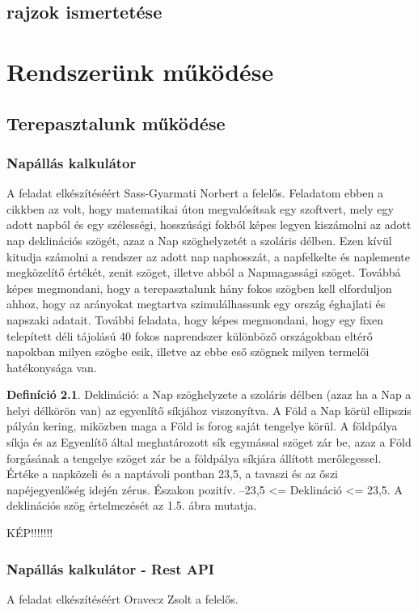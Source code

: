 \documentclass[
]{thesis-ekf}
\theoremstyle{definition}
\newtheorem{definicio}[tetel]{Definíció}
\theoremstyle{remark}
\begin{document}
	\section{rajzok ismertetése}

\chapter{Rendszerünk működése}
	\section{Terepasztalunk működése}
		\subsection{Napállás kalkulátor}
			A feladat elkészítéséért Sass-Gyarmati Norbert a felelős. Feladatom ebben a cikkben az volt, hogy matematikai úton megvalósítsak egy szoftvert, mely egy adott napból és egy szélességi, hosszúsági fokból képes legyen kiszámolni az adott nap deklinációs szögét, azaz a Nap szöghelyzetét a szoláris délben. Ezen kívül kitudja számolni a rendszer az adott nap naphosszát, a napfelkelte és naplemente megközelítő értékét, zenit szöget, illetve abból a Napmagassági szöget. Továbbá képes megmondani, hogy a terepasztalunk hány fokos szögben kell elforduljon ahhoz, hogy az arányokat megtartva szimulálhassunk egy ország éghajlati és napszaki adatait. További feladata, hogy képes megmondani, hogy egy fixen telepített déli tájolású 40 fokos naprendszer különböző országokban eltérő napokban milyen szögbe esik, illetve az ebbe eső szögnek milyen termelői hatékonysága van.
			\begin{definicio}
				Deklináció: a Nap szöghelyzete a szoláris délben (azaz ha a Nap a helyi délkörön van) az egyenlítő síkjához viszonyítva. A Föld a Nap körül ellipszis pályán kering, miközben maga a Föld is forog saját tengelye körül. A földpálya síkja és az Egyenlítő által meghatározott sík egymással szöget zár be, azaz a Föld forgásának a tengelye szöget zár be a földpálya síkjára állított merőlegessel. Értéke a napközeli és a naptávoli pontban 23,5, a tavaszi és az őszi napéjegyenlőség idején zérus. Északon pozitív. –23,5 <=  Deklináció <= 23,5. A deklinációs szög értelmezését az 1.5. ábra mutatja.
				\par KÉP!!!!!!!
				\cite{Kornyezet}
				
			\end{definicio}
		\subsection{Napállás kalkulátor - Rest API}
			A feladat elkészítéséért Oravecz Zsolt a felelős. 
\end{document}
